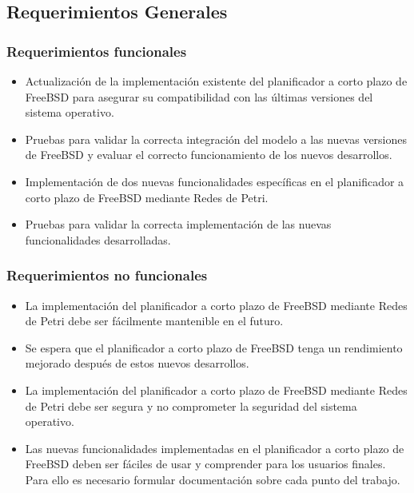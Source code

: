 \subsection{Requerimientos Generales}

\subsubsection{Requerimientos funcionales}
\begin{itemize}
    \item Actualización de la implementación existente del planificador a corto plazo de FreeBSD para asegurar su compatibilidad con las últimas versiones del sistema operativo.
    \item Pruebas para validar la correcta integración del modelo a las nuevas versiones de FreeBSD y evaluar el correcto funcionamiento de los nuevos desarrollos.
    \item Implementación de dos nuevas funcionalidades específicas en el planificador a corto plazo de FreeBSD mediante Redes de Petri.
    \item Pruebas para validar la correcta implementación de las nuevas funcionalidades desarrolladas.
\end{itemize}

\subsubsection{Requerimientos no funcionales}
\begin{itemize}
    \item La implementación del planificador a corto plazo de FreeBSD mediante Redes de Petri debe ser fácilmente mantenible en el futuro.
    \item Se espera que el planificador a corto plazo de FreeBSD tenga un rendimiento mejorado después de estos nuevos desarrollos.
    \item La implementación del planificador a corto plazo de FreeBSD mediante Redes de Petri debe ser segura y no comprometer la seguridad del sistema operativo.
    \item Las nuevas funcionalidades implementadas en el planificador a corto plazo de FreeBSD deben ser fáciles de usar y comprender para los usuarios finales. Para ello es necesario formular documentación sobre cada punto del trabajo.
\end{itemize}
